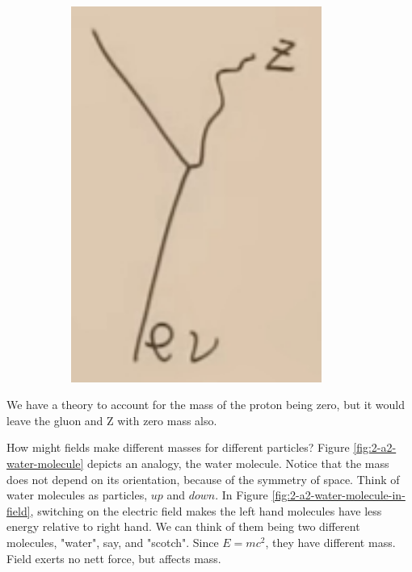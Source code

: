 \documentclass[]{article}
\begin{document}
\begin{figure}[H]
\begin{subfigure}[t]{0.3\textwidth}
		\includegraphics[width=0.9\textwidth]{2-a2-feynman3}
	\end{subfigure}
\end{figure} 

We have a theory to account for the mass of the proton being zero, but it would leave the gluon and Z with zero mass also.

How might fields make different masses for different particles? Figure \ref{fig:2-a2-water-molecule} depicts an analogy, the water molecule. Notice that the mass does not depend on its orientation, because of the symmetry of space. Think of water molecules as particles, $up$ and $down$. In Figure \ref{fig:2-a2-water-molecule-in-field}, switching on the electric field makes the left hand molecules have less energy relative to right hand. We can think of them being two different molecules, "water", say, and "scotch". Since $E=mc^2$, they have different mass. Field exerts no nett force, but affects mass.  
\end{document}
